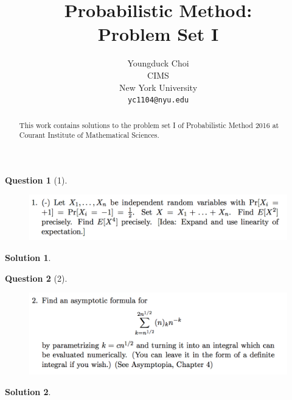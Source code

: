 \documentclass{article} %
\title{Probabilistic Method: \\
Problem Set I}
\author{
Youngduck Choi \\
CIMS \\
New York University\\
\texttt{yc1104@nyu.edu} \\
}
\theoremstyle{quest}
\newtheorem*{question}{Question}
\newtheorem*{solution}{Solution}
\begin{document}
\maketitle

\begin{abstract}
This work contains solutions to the problem set I
of Probabilistic Method 2016 at Courant Institute of Mathematical Sciences.
\end{abstract}

\bigskip

\begin{question}[1]
\hfill
\begin{figure}[h!]
  \centering
    \includegraphics[width=1\textwidth]{PM-2-1.png}
\end{figure}
\end{question}
\begin{solution}
\end{solution}

\newpage

\begin{question}[2]
\hfill
\begin{figure}[h!]
  \centering
    \includegraphics[width=1\textwidth]{PM-2-2.png}
\end{figure}
\end{question}
\begin{solution}

\end{solution}

\newpage
\end{document}
